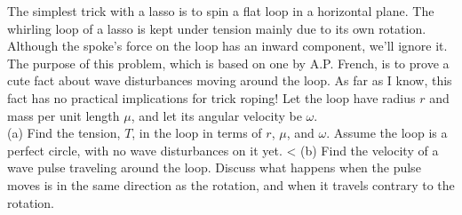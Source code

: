 The simplest trick with a lasso is to spin a flat loop in a horizontal
plane. The whirling loop of a lasso is kept under tension mainly due
to its own rotation. Although the spoke's force on the loop has an
inward component, we'll ignore it. The purpose of this problem,
which is based on one by A.P. French, is to prove a cute fact
about wave disturbances moving around the loop. As far as I
know, this fact has no practical implications for trick roping!
Let the loop have radius $r$ and mass per unit length $\mu$, 
and let its angular velocity be $\omega$.\\
(a) Find the
tension, $T$, in the loop in terms of $r$, $\mu$, and $\omega$. Assume
the loop is a perfect circle, with no wave disturbances on it yet.
<%
(b) Find the velocity of a wave pulse traveling around the
loop. Discuss what happens when the pulse moves is in the
same direction as the rotation, and when it travels contrary to the
rotation.\answercheck
